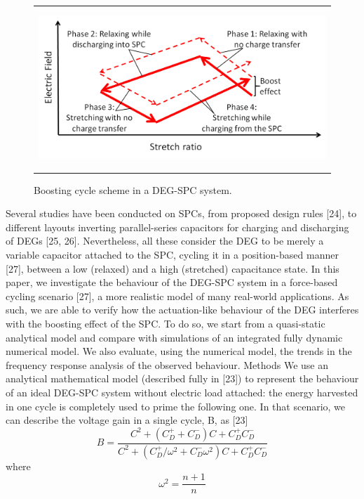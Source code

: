 \begin{figure}[ht]
\begin{center}
\begin{tabular}{c}
\includegraphics[height=6cm]{fig04/SPC_cycle_ph2.png}
\end{tabular}
\end{center}
\caption 
{ \label{fig:SPC_cycle}
Boosting cycle scheme in a DEG-SPC system.}
\end{figure}   


Several studies have been conducted on SPCs, from proposed design rules [24], to different layouts inverting parallel-series capacitors for charging and discharging of DEGs [25, 26]. Nevertheless, all these consider the DEG to be merely a variable capacitor attached to the SPC, cycling it in a position-based manner [27], between a low (relaxed) and a high (stretched) capacitance state.
In this paper, we investigate the behaviour of the DEG-SPC system in a force-based cycling scenario [27], a more realistic model of many real-world applications. As such, we are able to verify how the actuation-like behaviour of the DEG interferes with the boosting effect of the SPC. To do so, we start from a quasi-static analytical model and compare with simulations of an integrated fully dynamic numerical model. We also evaluate, using the numerical model, the trends in the frequency response analysis of the observed behaviour.
	Methods
We use an analytical mathematical model (described fully in [23]) to represent the behaviour of an ideal DEG-SPC system without electric load attached: the energy harvested in one cycle is completely used to prime the following one. In that scenario, we can describe the voltage gain in a single cycle, B, as [23]
\begin{equation}
B=\frac{C^2+(C_D^{+} + C_D^{-})C+C_D^{+}C_D^{-}}{C^2+(C_D^{+}/\omega^2 +C_D^{-}\omega^2)C+C_D^{+}C_D^{-}} 
\end{equation}
where 
\begin{equation}
\omega^2=  \frac{n+1}{n}
\end{equation}


